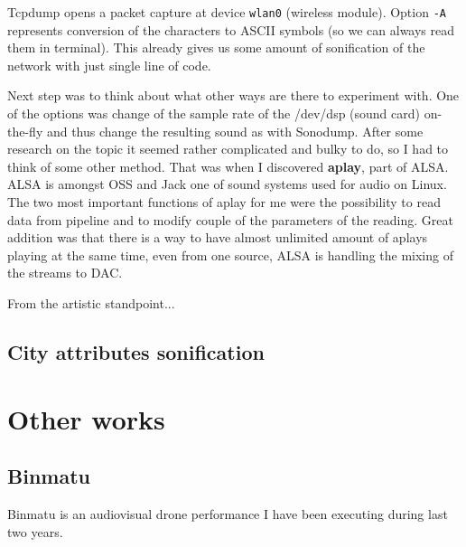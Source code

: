 \documentclass[11pt,a4paper,oneside]{report}
\begin{document}
Tcpdump opens a packet capture at device \texttt{wlan0} (wireless module). Option \texttt{-A} represents conversion of the characters to ASCII symbols (so we can always read them in terminal). This already gives us some amount of sonification of the network with just single line of code. 

Next step was to think about what other ways are there to experiment with. One of the options was change of the sample rate of the /dev/dsp (sound card) on-the-fly and thus change the resulting sound as with Sonodump. After some research on the topic it seemed rather complicated and bulky to do, so I had to think of some other method. That was when I discovered \textbf{aplay}, part of ALSA. ALSA is amongst OSS and Jack one of sound systems used for audio on Linux. The two most important functions of aplay for me were the possibility to read data from pipeline and to modify couple of the parameters of the reading. Great addition was that there is a way to have almost unlimited amount of aplays playing at the same time, even from one source, ALSA is handling the mixing of the streams to DAC.

From the artistic standpoint...

\section{City attributes sonification}

\chapter{Other works} 
\section{Binmatu} Binmatu is an audiovisual drone performance I have been executing during last two years.
\end{document}
